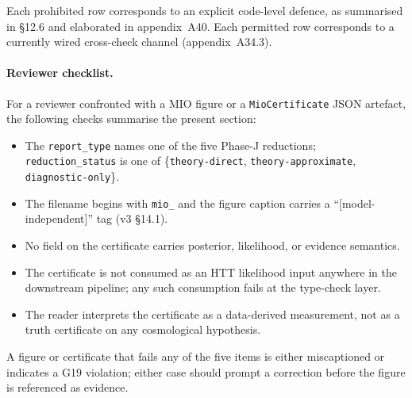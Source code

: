 Each prohibited row corresponds to an explicit code-level
defence, as summarised in §12.6 and elaborated in
appendix~A40.  Each permitted row corresponds to a
currently wired cross-check channel
(appendix~A34.3).

\paragraph{Reviewer checklist.}

For a reviewer confronted with a MIO figure or a
\texttt{MioCertificate} JSON artefact, the following checks
summarise the present section:

\begin{itemize}
\item The \texttt{report\_type} names one of the five
  Phase-J reductions;
  \texttt{reduction\_status} is one of
  \{\texttt{theory-direct},
  \texttt{theory-approximate},
  \texttt{diagnostic-only}\}.
\item The filename begins with \texttt{mio\_} and the
  figure caption carries a
  ``[model-independent]'' tag (v3 §14.1).
\item No field on the certificate carries posterior,
  likelihood, or evidence semantics.
\item The certificate is not consumed as an HTT likelihood
  input anywhere in the downstream pipeline; any such
  consumption fails at the type-check layer.
\item The reader interprets the certificate as a
  data-derived measurement, not as a truth certificate on
  any cosmological hypothesis.
\end{itemize}

A figure or certificate that fails any of the five items is
either miscaptioned or indicates a G19 violation; either
case should prompt a correction before the figure is
referenced as evidence.
